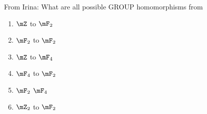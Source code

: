 \begin{exercise}{}{}
    From Irina: What are all possible GROUP homomorphisms from 
    \begin{enumerate}
        \item $\mZ$ to $\mF_2$
        \item $\mF_2$ to $\mF_2$
        \item $\mZ$ to $\mF_4$
        \item $\mF_4$ to $\mF_2$
        \item $\mF_2$ $\mF_4$
        \item $\mZ_2$ to $\mF_2$
    \end{enumerate}
\end{exercise}